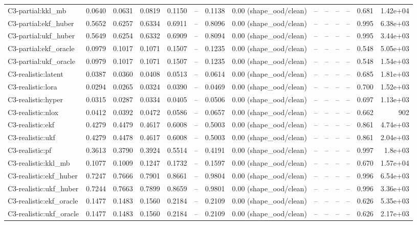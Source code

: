 \begin{table}[t]
\begin{tabular}{lrrrrrrrrrrrrr}
C3-partial:kkl\_mb & 0.0640 & 0.0631 & 0.0819 & 0.1150 & – & 0.1138 & 0.00 (shape\_ood/clean) & – & – & – & – & 0.681 & 1.42e+04 \\
C3-partial:ekf\_huber & 0.5652 & 0.6257 & 0.6334 & 0.6911 & – & 0.8096 & 0.00 (shape\_ood/clean) & – & – & – & – & 0.995 & 6.38e+03 \\
C3-partial:ukf\_huber & 0.5649 & 0.6254 & 0.6332 & 0.6909 & – & 0.8094 & 0.00 (shape\_ood/clean) & – & – & – & – & 0.995 & 3.44e+03 \\
C3-partial:ekf\_oracle & 0.0979 & 0.1017 & 0.1071 & 0.1507 & – & 0.1235 & 0.00 (shape\_ood/clean) & – & – & – & – & 0.548 & 5.05e+03 \\
C3-partial:ukf\_oracle & 0.0979 & 0.1017 & 0.1071 & 0.1507 & – & 0.1235 & 0.00 (shape\_ood/clean) & – & – & – & – & 0.548 & 1.54e+03 \\
C3-realistic:latent & 0.0387 & 0.0360 & 0.0408 & 0.0513 & – & 0.0614 & 0.00 (shape\_ood/clean) & – & – & – & – & 0.685 & 1.81e+03 \\
C3-realistic:lora & 0.0294 & 0.0265 & 0.0324 & 0.0390 & – & 0.0469 & 0.00 (shape\_ood/clean) & – & – & – & – & 0.700 & 1.52e+03 \\
C3-realistic:hyper & 0.0315 & 0.0287 & 0.0334 & 0.0405 & – & 0.0506 & 0.00 (shape\_ood/clean) & – & – & – & – & 0.697 & 1.13e+03 \\
C3-realistic:nlox & 0.0412 & 0.0392 & 0.0472 & 0.0586 & – & 0.0657 & 0.00 (shape\_ood/clean) & – & – & – & – & 0.662 & 902 \\
C3-realistic:ekf & 0.4279 & 0.4479 & 0.4617 & 0.6008 & – & 0.5003 & 0.00 (shape\_ood/clean) & – & – & – & – & 0.861 & 4.74e+03 \\
C3-realistic:ukf & 0.4279 & 0.4478 & 0.4617 & 0.6008 & – & 0.5003 & 0.00 (shape\_ood/clean) & – & – & – & – & 0.861 & 2.04e+03 \\
C3-realistic:pf & 0.3613 & 0.3790 & 0.3924 & 0.5514 & – & 0.4191 & 0.00 (shape\_ood/clean) & – & – & – & – & 0.997 & 1.8e+03 \\
C3-realistic:kkl\_mb & 0.1077 & 0.1009 & 0.1247 & 0.1732 & – & 0.1597 & 0.00 (shape\_ood/clean) & – & – & – & – & 0.670 & 1.57e+04 \\
C3-realistic:ekf\_huber & 0.7247 & 0.7666 & 0.7901 & 0.8661 & – & 0.9804 & 0.00 (shape\_ood/clean) & – & – & – & – & 0.996 & 6.54e+03 \\
C3-realistic:ukf\_huber & 0.7244 & 0.7663 & 0.7899 & 0.8659 & – & 0.9801 & 0.00 (shape\_ood/clean) & – & – & – & – & 0.996 & 3.36e+03 \\
C3-realistic:ekf\_oracle & 0.1477 & 0.1483 & 0.1560 & 0.2184 & – & 0.2109 & 0.00 (shape\_ood/clean) & – & – & – & – & 0.626 & 5.35e+03 \\
C3-realistic:ukf\_oracle & 0.1477 & 0.1483 & 0.1560 & 0.2184 & – & 0.2109 & 0.00 (shape\_ood/clean) & – & – & – & – & 0.626 & 2.17e+03 \\
\bottomrule
\end{tabular}
\end{table}
